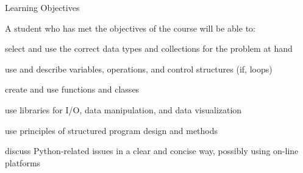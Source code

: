 \documentclass{beamer}%
\begin{document}
\begin{frame}{Learning Objectives}


A student who has met the objectives of the course will be able to:
\begin{itemize}
{\footnotesize
\item select and use the correct data types and collections for the problem at hand
\item use and describe variables, operations, and control structures (if, loops)
\item create and use functions and classes %
\item use libraries for I/O, data manipulation, and data visualization
\item use principles of structured program design and methods
\item discuss Python-related issues in a clear and concise way, possibly using on-line platforms
}
\end{itemize}

\end{frame}
\end{document}
